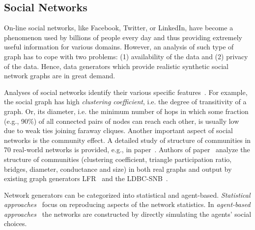 \subsection{Social Networks}
\label{sec:generators_socialnetworks}

On-line social networks, like Facebook, Twitter, or LinkedIn, have become a phenomenon used by billions of people every day and thus providing extremely useful information for various domains. However, an analysis of such type of graph has to cope with two problems: (1) availability of the data and (2) privacy of the data. Hence, data generators which provide realistic synthetic social network graphs are in great demand.

Analyses of social networks identify their various specific features~\cite{Chakrabarti:2006:GML:1132952.1132954}. For example, the social graph has high \emph{clustering coefficient}, i.e. the degree of transitivity of a graph. Or, its diameter, i.e. the minimum number of hops in which some fraction (e.g., 90\%) of all connected pairs of nodes can reach each other, is usually low due to weak ties joining faraway cliques. Another important aspect of social networks is the community effect. A detailed study of structure of communities in 70 real-world networks is provided, e.g., in paper~\cite{Leskovec:2008:SPC:1367497.1367591}. Authors of paper~\cite{Prat-Perez:2014:CSS:2621934.2621942} analyze the structure of communities (clustering coefficient, triangle participation ratio, bridges, diameter, conductance and size) in both real graphs and output by existing graph generators LFR~\cite{PhysRevE.78.046110} and the LDBC-SNB~\cite{Erling:2015:LSN:2723372.2742786}. %

Network generators can be categorized into statistical and agent-based. \emph{Statistical approaches}~\cite{PhysRevE.78.046110,Yao2011,Armstrong:2013:LDB:2463676.2465296,Pham2013,Sukthankar-SocialInfo2014,Erling:2015:LSN:2723372.2742786,Nettleton2016} focus on reproducing aspects of the network statistics. In \emph{agent-based approaches}~\cite{Barrett:2009:GAL:1995456.1995598,Bernstein:2013:SAS:2499604.2499609}  the networks are constructed by directly simulating the agents' social choices.


